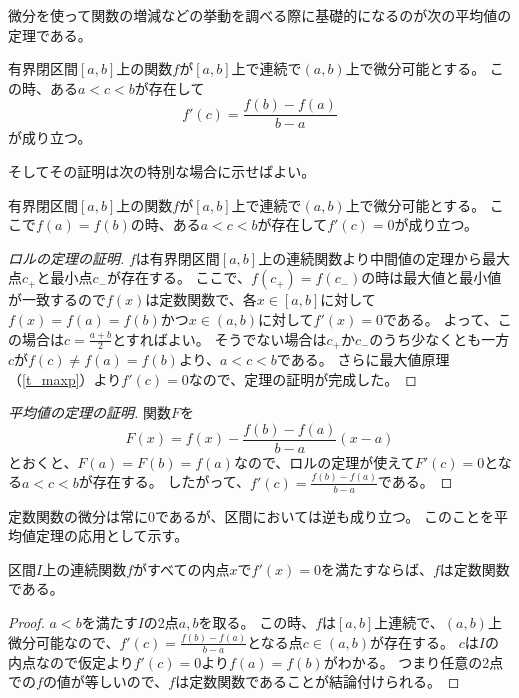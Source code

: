 微分を使って関数の増減などの挙動を調べる際に基礎的になるのが次の平均値の定理である。

\begin{theorem}[平均値の定理]
有界閉区間$[a, b]$上の関数$f$が$[a, b]$上で連続で$(a, b)$上で微分可能とする。
この時、ある$a < c < b$が存在して
$$
f'(c) = \frac{f(b)-f(a)}{b-a}
$$
が成り立つ。
\end{theorem}

そしてその証明は次の特別な場合に示せばよい。

\begin{theorem}[ロルの定理]
有界閉区間$[a, b]$上の関数$f$が$[a, b]$上で連続で$(a, b)$上で微分可能とする。
ここで$f(a) = f(b)$の時、ある$a < c < b$が存在して$f'(c) = 0$が成り立つ。
\end{theorem}

\begin{proof}[ロルの定理の証明]
$f$は有界閉区間$[a, b]$上の連続関数より中間値の定理から最大点$c_+$と最小点$c_-$が存在する。
ここで、$f(c_+) = f(c_-)$の時は最大値と最小値が一致するので$f(x)$は定数関数で、各$x \in [a, b]$に対して$f(x) = f(a) = f(b)$かつ$x \in (a, b)$に対して$f'(x) = 0$である。
よって、この場合は$c = \frac{a+b}{2}$とすればよい。
そうでない場合は$c_+$か$c_-$のうち少なくとも一方$c$が$f(c) \ne f(a) = f(b)$より、$a < c < b$である。
さらに最大値原理（\ref{t_maxp}）より$f'(c) = 0$なので、定理の証明が完成した。
\end{proof}

\begin{proof}[平均値の定理の証明]
関数$F$を
$$
F(x) = f(x)-\frac{f(b)-f(a)}{b-a}(x-a)
$$
とおくと、$F(a) = F(b) = f(a)$なので、ロルの定理が使えて$F'(c) = 0$となる$a < c < b$が存在する。
したがって、$f'(c) = \frac{f(b)-f(a)}{b-a}$である。
\end{proof}

定数関数の微分は常に$0$であるが、区間においては逆も成り立つ。
このことを平均値定理の応用として示す。

\begin{theorem}
区間$I$上の連続関数$f$がすべての内点$x$で$f'(x) = 0$を満たすならば、$f$は定数関数である。
\end{theorem}

\begin{proof}
$a < b$を満たす$I$の2点$a, b$を取る。
この時、$f$は$[a, b]$上連続で、$(a, b)$上微分可能なので、$f'(c) = \frac{f(b)-f(a)}{b-a}$となる点$c \in (a, b)$が存在する。
$c$は$I$の内点なので仮定より$f'(c) = 0$より$f(a) = f(b)$がわかる。
つまり任意の2点での$f$の値が等しいので、$f$は定数関数であることが結論付けられる。
\end{proof}

